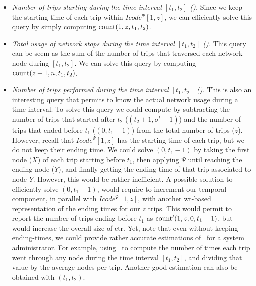 	\begin{itemize}[leftmargin=3mm]
	\setlength{\itemindent}{0mm}


	\item {\em Number of trips starting during the time interval $[t_1,t_2]$ (\Tst).} Since we keep the
	starting time of each trip within $Icode^{\Psi}[1,z]$, we can efficiently solve this query 
	by simply computing $\operatorname{count}(1,z,t_1,t_2)$.

	\item  {\em Total usage of network stops during the time interval $[t_1,t_2]$ (\Tut).} This query
	can be seem as the sum of the number of trips that traversed each network node during $[t_1,t_2]$.
	We can solve this query by computing $\operatorname{count}(z+1,n,t_1,t_2)$. 

	\item {\em Number of trips performed during the time interval $[t_1,t_2]$ (\Ttt).} This is also an
	interesting query that permits to know the actual network usage during a time interval. 
	To solve this query
	we could compute {\em \Ttt} by subtracting the number of trips that started after $t_2$ 
	(\textit{\Tst}$(t_2+1,\sigma^t-1) $) and the number of trips that ended 
	before $t_1$ (\textit{\Tet}$(0,t_1-1) $) from the total number of trips ($z$). 
	However, recall that
	$Icode^{\Psi}[1,z]$ has the starting time of each trip, but we do not keep their ending time.
	We could solve \textit{\Tet}$(0,t_1-1)$ by taking the first node ($X$) of each trip starting
	before $t_1$, then applying $\Psi$ until reaching the ending node ($Y$), and finally getting the ending
	time of that trip associated to node $Y$. However, this would be rather inefficient.
	A possible solution to efficiently solve \textit{\Tet}$(0,t_1-1)$, would require to increment our temporal
	component, in parallel with $Icode^{\Psi}[1,z]$,  with another \gls{wt}-based representation of the 
	ending times for our $z$ trips. This would permit to report the number of trips
	ending before $t_1$ as $\operatorname{count}'(1,z,0,t_1-1)$, but would increase the overall size of \gls{ctr}.
	Yet, note that even without keeping ending-times, we could 
	provide rather accurate estimations of \Ttt\ for a system administrator. For example, using \Tut\
	to compute the number of times each trip went through any node during the time interval $[t_1,t_2]$, 
	and dividing that value by the average nodes per trip. Another good estimation can also be obtained with 
	{\em\Tst$(t_1,t_2)$}.



\end{itemize}

